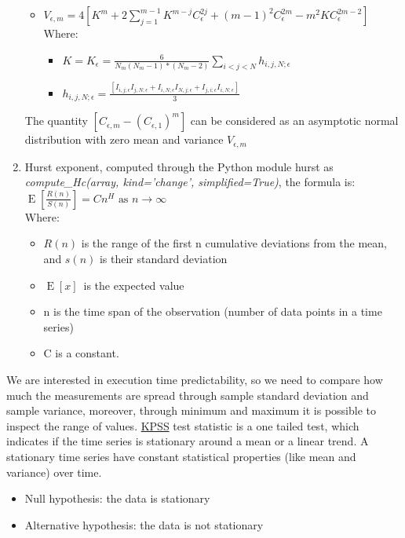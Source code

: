 \begin{enumerate}
\begin{itemize}
		\item $V_{\epsilon,m} = 4[{K}^{m} + 2\sum_{j=1}^{m-1}{K}^{m-j}{C}^{2j}_\epsilon + {(m-1)}^{2}{C}^{2m}_\epsilon - {m}^{2}K{C}^{2m-2}_\epsilon]$
		Where:
		\begin{itemize}
			\item $K=K_\epsilon = \frac{6}{N_m(N_m-1)*(N_m-2)}\sum_{i<j<N}h_{i,j,N;\epsilon}$
			\item $h_{i,j,N;\epsilon} = \frac{[I_{i,j;\epsilon}I_{j,N;\epsilon}+I_{i,N;\epsilon}I_{N,j;\epsilon}+I_{j,i;\epsilon}I_{i,N;\epsilon}]}{3}$
		\end{itemize}
	\end{itemize}
	The quantity $[C_{\epsilon,m}-{(C_{\epsilon,1})}^{m}]$ can be considered as an asymptotic normal distribution with zero mean and variance $V_{\epsilon,m}$
	\item Hurst exponent, computed through the Python module hurst as \textit{compute\_Hc(array, kind='change', simplified=True)}, the formula is:\\[0.5cm]
	$\operatorname{E} \left [ \frac{R(n)}{S(n)} \right ]=C n^H  \text{  as } n \to \infty  \, $
	\\[0.5cm] Where:
	\begin{itemize}
		\item $R(n)$ is the range of the first n cumulative deviations from the mean, and $s(n)$ is their standard deviation
		\item $\operatorname{E} \left [x \right ] \,$ is the expected value
		\item n is the time span of the observation (number of data points in a time series)
		\item C is a constant.
	\end{itemize}
\end{enumerate}
We are interested in execution time predictability, so we need to compare how much the measurements are spread through sample standard deviation and sample variance, moreover, through minimum and maximum it is possible to inspect the range of values.
\href{http://debis.deu.edu.tr/userweb//onder.hanedar/dosyalar/kpss.pdf}{KPSS} test statistic is a one tailed test, which indicates if the time series is stationary around a mean or a linear trend. A stationary time series have constant statistical properties (like mean and variance) over time.
\begin{itemize}
	\item Null hypothesis: the data is stationary
	\item Alternative hypothesis: the data is not stationary
\end{itemize}

